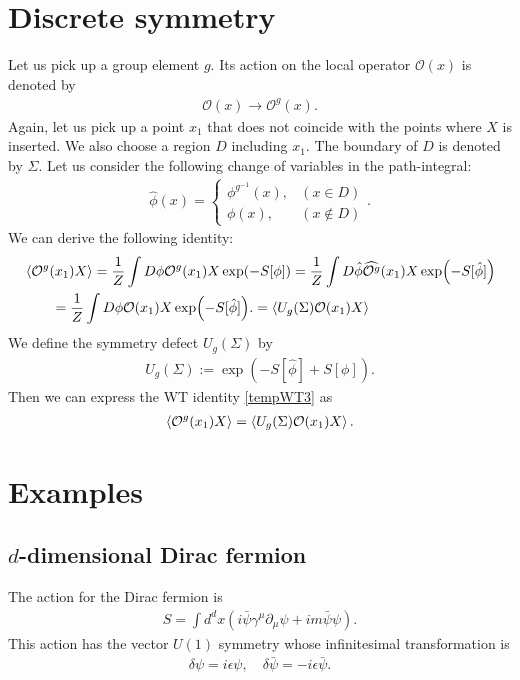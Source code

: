 \documentclass[12pt]{scrartcl}
\newcommand{\del}{\partial}
\newcommand{\Ocal}{\mathcal{O}}
\newcommand{\phih}{\hat{\phi}}
\newcommand{\psib}{\bar{\psi}}
\begin{document}
\section{Discrete symmetry}
Let us pick up a group element $g$. Its action on the local operator $\Ocal(x)$ is denoted by
\begin{align}
    \Ocal(x)\to \Ocal^g(x).
\end{align}
Again, let us pick up a point $x_1$ that does not coincide with the points where $X$ is inserted.  We also choose a region $D$ including $x_1$.  The boundary of $D$ is denoted by $\Sigma$.  Let us consider the following change of variables in the path-integral:
\begin{align}
    \phih(x)=
    \begin{cases}
        \phi^{g^{-1}}(x),& (x\in D)\\
        \phi(x),& (x\notin D)
    \end{cases}.
\end{align}
We can derive the following identity:
\begin{align}
    &\expval{\Ocal^{g}(x_1) X}
    =\frac{1}{Z}\int D\phi \Ocal^{g}(x_1) X \exp(-S[\phi])
    =\frac{1}{Z}\int D\phih \widehat{\Ocal^{g}}(x_1) X \exp(-S[\phih])\nonumber\\    
    &\qquad =\frac{1}{Z}\int D\phi \Ocal(x_1) X \exp(-S[\phih]).
    \label{tempWT3}
    =\expval{U_{g}(\Sigma)\Ocal(x_1)X}
\end{align}
We define the symmetry defect $U_{g}(\Sigma)$ by
\begin{align}
    U_{g}(\Sigma):=\exp(-S[\phih]+S[\phi]).\label{symmetryoperator}
\end{align}
Then we can express the WT identity \eqref{tempWT3} as
\begin{align}
    \expval{\Ocal^{g}(x_1)X}
    =\expval{U_{g}(\Sigma)\Ocal(x_1)X}.
\end{align}

\section{Examples}
\subsection{$d$-dimensional Dirac fermion}
The action for the Dirac fermion is
\begin{align}
    S=\int d^d x \left(i \psib \gamma^{\mu}\del_{\mu}\psi+im \psib\psi\right).
\end{align}
This action has the vector $U(1)$ symmetry whose infinitesimal transformation is
\begin{align}
    \delta\psi=i\epsilon\psi,\quad 
    \delta\psib=-i\epsilon\psib.
\end{align}
\end{document}
